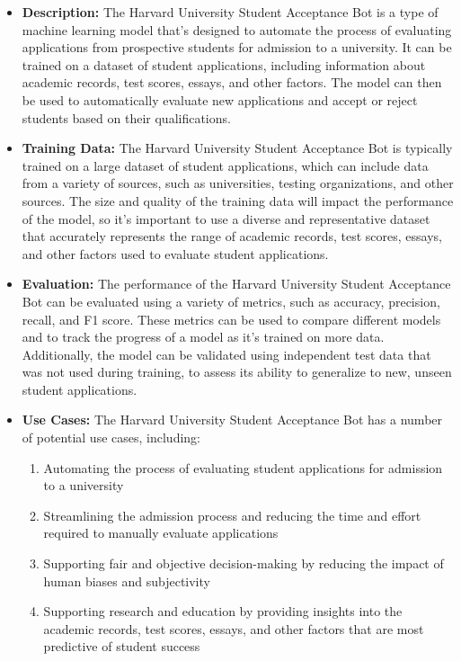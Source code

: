 \begin{itemize}
\begin{itemize}
    \item \textbf{Description:} The Harvard University Student Acceptance Bot is a type of machine learning model that's designed to automate the process of evaluating applications from prospective students for admission to a university. It can be trained on a dataset of student applications, including information about academic records, test scores, essays, and other factors. The model can then be used to automatically evaluate new applications and accept or reject students based on their qualifications.
    \item \textbf{Training Data:} The Harvard University Student Acceptance Bot is typically trained on a large dataset of student applications, which can include data from a variety of sources, such as universities, testing organizations, and other sources. The size and quality of the training data will impact the performance of the model, so it's important to use a diverse and representative dataset that accurately represents the range of academic records, test scores, essays, and other factors used to evaluate student applications.
    \item \textbf{Evaluation:} The performance of the Harvard University Student Acceptance Bot can be evaluated using a variety of metrics, such as accuracy, precision, recall, and F1 score. These metrics can be used to compare different models and to track the progress of a model as it's trained on more data. Additionally, the model can be validated using independent test data that was not used during training, to assess its ability to generalize to new, unseen student applications.
    \item \textbf{Use Cases:} The Harvard University Student Acceptance Bot has a number of potential use cases, including:
        \begin{enumerate}  
            \item Automating the process of evaluating student applications for admission to a university
            \item Streamlining the admission process and reducing the time and effort required to manually evaluate applications
            \item Supporting fair and objective decision-making by reducing the impact of human biases and subjectivity
            \item Supporting research and education by providing insights into the academic records, test scores, essays, and other factors that are most predictive of student success

\end{enumerate}
\end{itemize}
\end{itemize}

